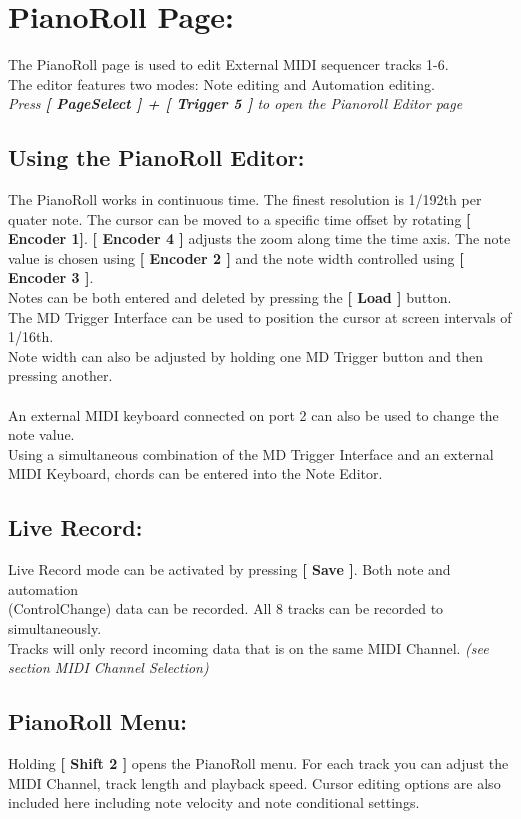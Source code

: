 \chapter{PianoRoll Page:}
The PianoRoll page is used to edit External MIDI sequencer tracks 1-6.\\
The editor features two modes: Note editing and Automation editing.
\\
\textit{Press \textbf{[ PageSelect ] + [ Trigger 5 ]} to open the Pianoroll Editor page}
\section{Using the PianoRoll Editor:}
The PianoRoll works in continuous time. The finest resolution is 1/192th per quater note. The cursor can be moved to a specific time offset by rotating \textbf{[ Encoder 1]}. \textbf{[ Encoder 4 ]} adjusts the zoom along time the time axis. The note value is chosen using \textbf{[ Encoder 2 ]} and the note width controlled using \textbf{[ Encoder 3 ]}.\\
Notes can be both entered and deleted by pressing the \textbf{[ Load ]} button.\\
\newpage
The MD Trigger Interface can be used to position the cursor at screen intervals of 1/16th.\\
Note width can also be adjusted by holding one MD Trigger button and then pressing another.\\\\
An external MIDI keyboard connected on port 2 can also be used to change the note value.\\
Using a simultaneous combination of the MD Trigger Interface and an external MIDI Keyboard, chords can be entered into the Note Editor.
\section{Live Record:}
Live Record mode can be activated by pressing  \textbf{[ Save ]}. Both note and automation \\(ControlChange) data can be recorded. All 8 tracks can be recorded to simultaneously.
\\Tracks will only record incoming data that is on the same MIDI Channel. \textit{(see section MIDI Channel Selection)}

\section{PianoRoll Menu:}
Holding \textbf{[ Shift 2 ]} opens the PianoRoll menu. For each track you can adjust the MIDI Channel, track length and playback speed. Cursor editing options are also included here including note velocity and note conditional settings.

